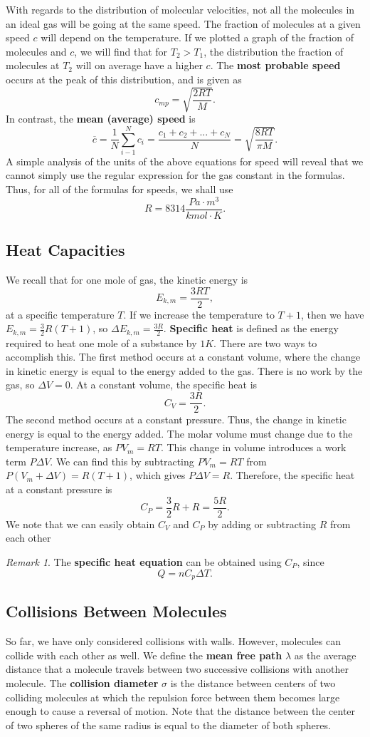 \documentclass[11pt]{article}
\theoremstyle{plain} %
\theoremstyle{definition}
\theoremstyle{example}
\theoremstyle{remark}
\newtheorem*{remark}{Remark}
\begin{document}
With regards to the distribution of molecular velocities, not all the molecules in an ideal gas will be going at the same speed. The fraction of molecules at a given speed $c$ will depend on the temperature. If we plotted a graph of the fraction of molecules and $c$, we will find that for $T_2> T_1$, the distribution the fraction of molecules at $T_2$ will on average have a higher $c$. The \textbf{most probable speed} occurs at the peak of this distribution, and is given as 
$$c_{mp} = \sqrt{\frac{2RT}{M}}.$$
In contrast, the \textbf{mean (average) speed} is 
$$\overline{c} = \frac{1}{N}\sum_{i-1}^Nc_i = \frac{c_1 + c_2 + ... + c_N}{N} = \sqrt{\frac{8RT}{\pi M}}.$$
A simple analysis of the units of the above equations for speed will reveal that we cannot simply use the regular expression for the gas constant in the formulas. Thus, for all of the formulas for speeds, we shall use 
$$R = 8314 \frac{Pa\cdot m^3}{kmol \cdot K}.$$
	
\subsection{Heat Capacities}
We recall that for one mole of gas, the kinetic energy is 
$$E_{k,m} = \frac{3RT}{2},$$
at a specific temperature $T$. If we increase the temperature to $T+1$, then we have $E_{k,m} = \frac{3}{2}R(T+1)$, so $\Delta E_{k,m} = \frac{3R}{2}$. 
\textbf{Specific heat} is defined as the energy required to heat one mole of a substance by $1K$. There are two ways to accomplish this. The first method occurs at a constant volume, where the change in kinetic energy is equal to the energy added to the gas. There is no work by the gas, so $\Delta V = 0$. At a constant volume, the specific heat is 
$$C_V = \frac{3R}{2}.$$
The second method occurs at a constant pressure. Thus, the change in kinetic energy is equal to the energy added. The molar volume must change due to the temperature increase, as $PV_m = RT$. 
This change in volume introduces a work term $P\Delta V$. We can find this by subtracting $PV_m=RT$ from $P(V_m+\Delta V) = R(T+1)$, which gives $P\Delta V = R$. Therefore, the specific heat at a constant pressure is 
$$C_P = \frac{3}{2}R+R = \frac{5R}{2}.$$
We note that we can easily obtain $C_V$ and $C_P$ by adding or subtracting $R$ from each other 
\begin{remark}
The \textbf{specific heat equation} can be obtained using $C_P$, since 
$$Q = nC_p\Delta T.$$
\end{remark}

\subsection{Collisions Between Molecules}
So far, we have only considered collisions with walls. However, molecules can collide with each other as well. We define the \textbf{mean free path} $\lambda$ as the average distance that a molecule travels between two successive collisions with another molecule. The \textbf{collision diameter} $\sigma$ is the distance between centers of two colliding molecules at which the repulsion force between them becomes large enough to cause a reversal of motion. Note that the distance between the center of two spheres of the same radius is equal to the diameter of both spheres. 
\end{document}
